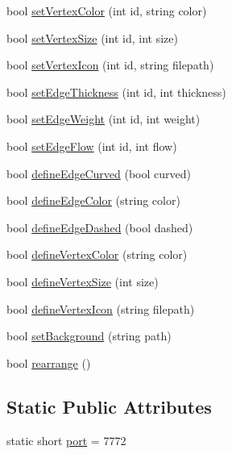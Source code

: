 \begin{DoxyCompactItemize}
\item 
bool \hyperlink{classGraphViewer_a8b542d7e09e81a45a74760c19233beb0}{set\+Vertex\+Color} (int id, string color)
\item 
bool \hyperlink{classGraphViewer_ae930dfdfcdeb7a871eefb6028d74b9f9}{set\+Vertex\+Size} (int id, int size)
\item 
bool \hyperlink{classGraphViewer_a02d5f7393eab9a2d1b66719039597a64}{set\+Vertex\+Icon} (int id, string filepath)
\item 
bool \hyperlink{classGraphViewer_a07f598272fe3515455eab13be749604a}{set\+Edge\+Thickness} (int id, int thickness)
\item 
bool \hyperlink{classGraphViewer_ac211de009a0afe2e6d44f4f8d030a2cc}{set\+Edge\+Weight} (int id, int weight)
\item 
bool \hyperlink{classGraphViewer_a69eb065145063e4dea41961e92e35c8e}{set\+Edge\+Flow} (int id, int flow)
\item 
bool \hyperlink{classGraphViewer_a08f362be0e682d91e7506dca8caae1b8}{define\+Edge\+Curved} (bool curved)
\item 
bool \hyperlink{classGraphViewer_a4102580b69826ba83251ef7bb262f8be}{define\+Edge\+Color} (string color)
\item 
bool \hyperlink{classGraphViewer_af785279b5c204df0e274b20c36276fc3}{define\+Edge\+Dashed} (bool dashed)
\item 
bool \hyperlink{classGraphViewer_a76de8676b7a93d72af514b84cdaa4d21}{define\+Vertex\+Color} (string color)
\item 
bool \hyperlink{classGraphViewer_ac4b2a9fec74d38e64088aa79ca4b7d9b}{define\+Vertex\+Size} (int size)
\item 
bool \hyperlink{classGraphViewer_af1adb6a361457187a820e01dcf0a34b7}{define\+Vertex\+Icon} (string filepath)
\item 
bool \hyperlink{classGraphViewer_a02437b5fecd8b90de24436068312d593}{set\+Background} (string path)
\item 
bool \hyperlink{classGraphViewer_a3009a66958686ccb7e78b68e37c3c423}{rearrange} ()
\end{DoxyCompactItemize}
\subsection*{Static Public Attributes}
\begin{DoxyCompactItemize}
\item 
static short \hyperlink{classGraphViewer_a89d0abe75f41feededc49497cc514342}{port} = 7772
\end{DoxyCompactItemize}
